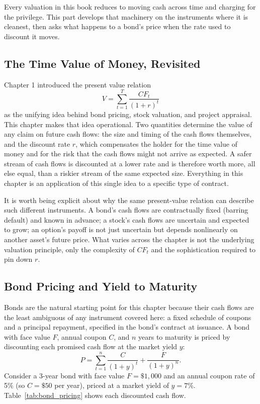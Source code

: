 \documentclass[../ai_in_finance]{subfiles}
\begin{document}
Every valuation in this book reduces to moving cash across time and charging for the privilege. This part develops that machinery on the instruments where it is cleanest, then asks what happens to a bond's price when the rate used to discount it moves.

\subsection{The Time Value of Money, Revisited}

Chapter 1 introduced the present value relation
$$V = \sum_{t=1}^{T} \frac{CF_t}{(1+r)^t}$$
as the unifying idea behind bond pricing, stock valuation, and project appraisal. This chapter makes that idea operational. Two quantities determine the value of any claim on future cash flows: the size and timing of the cash flows themselves, and the discount rate $r$, which compensates the holder for the time value of money and for the risk that the cash flows might not arrive as expected. A safer stream of cash flows is discounted at a lower rate and is therefore worth more, all else equal, than a riskier stream of the same expected size. Everything in this chapter is an application of this single idea to a specific type of contract.

It is worth being explicit about why the same present-value relation can describe such different instruments. A bond's cash flows are contractually fixed (barring default) and known in advance; a stock's cash flows are uncertain and expected to grow; an option's payoff is not just uncertain but depends nonlinearly on another asset's future price. What varies across the chapter is not the underlying valuation principle, only the complexity of $CF_t$ and the sophistication required to pin down $r$.

\subsection{Bond Pricing and Yield to Maturity}

Bonds are the natural starting point for this chapter because their cash flows are the least ambiguous of any instrument covered here: a fixed schedule of coupons and a principal repayment, specified in the bond's contract at issuance. A bond with face value $F$, annual coupon $C$, and $n$ years to maturity is priced by discounting each promised cash flow at the market yield $y$:
\begin{equation*}
P = \sum_{t=1}^{n} \frac{C}{(1+y)^t} + \frac{F}{(1+y)^n}.
\end{equation*}
Consider a 3-year bond with face value $F = \$1{,}000$ and an annual coupon rate of 5\% (so $C = \$50$ per year), priced at a market yield of $y = 7\%$. Table~\ref{tab:bond_pricing} shows each discounted cash flow.
\end{document}
